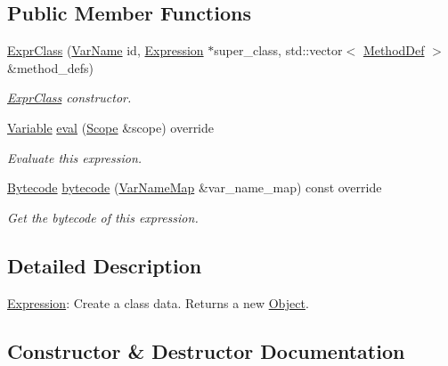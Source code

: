 \subsection*{Public Member Functions}
\begin{DoxyCompactItemize}
\item 
\hyperlink{classcreek_1_1_expr_class_ab83b88e76c0324503bf6c7f5ce6753f3}{Expr\+Class} (\hyperlink{classcreek_1_1_var_name}{Var\+Name} id, \hyperlink{classcreek_1_1_expression}{Expression} $\ast$super\+\_\+class, std\+::vector$<$ \hyperlink{structcreek_1_1_expr_class_1_1_method_def}{Method\+Def} $>$ \&method\+\_\+defs)
\begin{DoxyCompactList}\small\item\em {\ttfamily \hyperlink{classcreek_1_1_expr_class}{Expr\+Class}} constructor. \end{DoxyCompactList}\item 
\hyperlink{classcreek_1_1_variable}{Variable} \hyperlink{classcreek_1_1_expr_class_abeac4981d65498ebfa385e1dae6b82da}{eval} (\hyperlink{classcreek_1_1_scope}{Scope} \&scope) override
\begin{DoxyCompactList}\small\item\em Evaluate this expression. \end{DoxyCompactList}\item 
\hyperlink{classcreek_1_1_bytecode}{Bytecode} \hyperlink{classcreek_1_1_expr_class_ac7ad1a7eb717474c55234f4ec3b3f0e8}{bytecode} (\hyperlink{classcreek_1_1_var_name_map}{Var\+Name\+Map} \&var\+\_\+name\+\_\+map) const  override\hypertarget{classcreek_1_1_expr_class_ac7ad1a7eb717474c55234f4ec3b3f0e8}{}\label{classcreek_1_1_expr_class_ac7ad1a7eb717474c55234f4ec3b3f0e8}

\begin{DoxyCompactList}\small\item\em Get the bytecode of this expression. \end{DoxyCompactList}\end{DoxyCompactItemize}


\subsection{Detailed Description}
\hyperlink{classcreek_1_1_expression}{Expression}\+: Create a class data. Returns a new {\ttfamily \hyperlink{classcreek_1_1_object}{Object}}. 

\subsection{Constructor \& Destructor Documentation}
